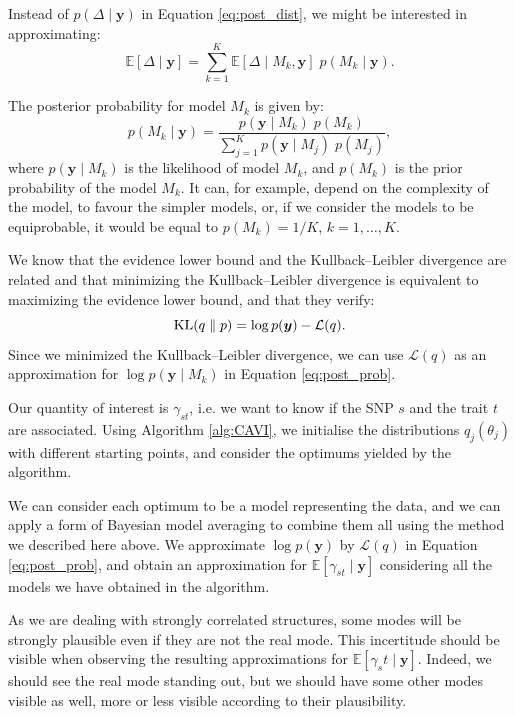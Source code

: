 \documentclass[a4paper, 11pt]{report}
\numberwithin{equation}{chapter}
\DeclareMathOperator*{\KL}{{\rm KL}}
\begin{document}
Instead of $p(\Delta \mid \boldsymbol{y})$ in Equation \ref{eq:post_dist}, we might be interested in approximating:
\begin{equation*}
\mathbb{E}\left[\Delta \mid \boldsymbol{y}\right] = \sum_{k=1}^K\mathbb{E}\left[\Delta \mid M_k, \boldsymbol{y}\right]\;p(M_k \mid \boldsymbol{y}).
\end{equation*}

The posterior probability for model $M_k$ is given by:
\begin{equation}
p(M_k \mid \boldsymbol{y}) = \frac{p(\boldsymbol{y} \mid M_k)\; p(M_k)}{\sum_{j=1}^K p(\boldsymbol{y} \mid M_j)\; p(M_j)},
\label{eq:post_prob}
\end{equation}
where $p(\boldsymbol{y} \mid M_k)$ is the likelihood of model $M_k$, and $p(M_k)$ is the prior probability of the model $M_k$. It can, for example, depend on the complexity of the model, to favour the simpler models, or, if we consider the models to be equiprobable, it would be equal to $p(M_k) = 1/K$, $k = 1,\ldots,K$.  

We know that the evidence lower bound and the Kullback--Leibler divergence are related and that minimizing the Kullback--Leibler divergence is equivalent to maximizing the evidence lower bound, and that they verify: 
\begin{equation*}
\KL(q\parallel p) = \log p (\boldsymbol{y}) - \mathcal{L}(q).
\end{equation*}
Since we minimized the Kullback--Leibler divergence, we can use $\mathcal{L}(q)$ as an approximation for $\log p(\boldsymbol{y}\mid M_k)$ in Equation \ref{eq:post_prob}.

Our quantity of interest is $\gamma_{st}$, i.e. we want to know if the SNP $s$ and the trait $t$ are associated. Using Algorithm \ref{alg:CAVI}, we initialise the distributions $q_j(\theta_j)$ with different starting points, and consider the optimums yielded by the algorithm.

We can consider each optimum to be a model representing the data, and we can apply a form of Bayesian model averaging to combine them all using the method we described here above. We approximate $\log p(\boldsymbol{y})$ by $\mathcal{L}(q)$ in Equation \ref{eq:post_prob}, and obtain an approximation for $\mathbb{E}\left[\gamma_{st}\mid \boldsymbol{y}\right]$ considering all the models we have obtained in the algorithm.

As we are dealing with strongly correlated structures, some modes will be strongly plausible even if they are not the real mode. This incertitude should be visible when observing the resulting approximations for $\mathbb{E}\left[\gamma_st\mid \boldsymbol{y}\right]$. Indeed, we should see the real mode standing out, but we should have some other modes visible as well, more or less visible according to their plausibility.
\newpage
\end{document}
